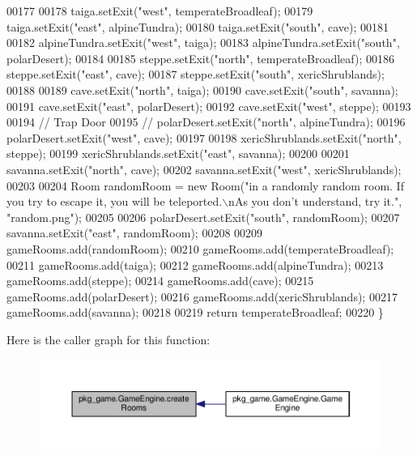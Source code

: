 \begin{DoxyCode}
00177 
00178         taiga.setExit(\textcolor{stringliteral}{"west"}, temperateBroadleaf);
00179         taiga.setExit(\textcolor{stringliteral}{"east"}, alpineTundra);
00180         taiga.setExit(\textcolor{stringliteral}{"south"}, cave);
00181 
00182         alpineTundra.setExit(\textcolor{stringliteral}{"west"}, taiga);
00183         alpineTundra.setExit(\textcolor{stringliteral}{"south"}, polarDesert);
00184 
00185         steppe.setExit(\textcolor{stringliteral}{"north"}, temperateBroadleaf);
00186         steppe.setExit(\textcolor{stringliteral}{"east"}, cave);
00187         steppe.setExit(\textcolor{stringliteral}{"south"}, xericShrublands);
00188 
00189         cave.setExit(\textcolor{stringliteral}{"north"}, taiga);
00190         cave.setExit(\textcolor{stringliteral}{"south"}, savanna);
00191         cave.setExit(\textcolor{stringliteral}{"east"}, polarDesert);
00192         cave.setExit(\textcolor{stringliteral}{"west"}, steppe);
00193 
00194         \textcolor{comment}{// Trap Door}
00195         \textcolor{comment}{// polarDesert.setExit("north", alpineTundra);}
00196         polarDesert.setExit(\textcolor{stringliteral}{"west"}, cave);
00197 
00198         xericShrublands.setExit(\textcolor{stringliteral}{"north"}, steppe);
00199         xericShrublands.setExit(\textcolor{stringliteral}{"east"}, savanna);
00200 
00201         savanna.setExit(\textcolor{stringliteral}{"north"}, cave);
00202         savanna.setExit(\textcolor{stringliteral}{"west"}, xericShrublands);
00203 
00204         Room randomRoom = \textcolor{keyword}{new} Room(\textcolor{stringliteral}{"in a randomly random room. If you try to escape it, you will be
       teleported.\(\backslash\)nAs you don't understand, try it."}, \textcolor{stringliteral}{"random.png"});
00205 
00206         polarDesert.setExit(\textcolor{stringliteral}{"south"}, randomRoom);
00207         savanna.setExit(\textcolor{stringliteral}{"east"}, randomRoom);
00208 
00209         gameRooms.add(randomRoom);
00210         gameRooms.add(temperateBroadleaf);
00211         gameRooms.add(taiga);
00212         gameRooms.add(alpineTundra);
00213         gameRooms.add(steppe);
00214         gameRooms.add(cave);
00215         gameRooms.add(polarDesert);
00216         gameRooms.add(xericShrublands);
00217         gameRooms.add(savanna);
00218 
00219         \textcolor{keywordflow}{return} temperateBroadleaf;
00220     \}
\end{DoxyCode}


Here is the caller graph for this function\-:
\nopagebreak
\begin{figure}[H]
\begin{center}
\leavevmode
\includegraphics[width=350pt]{classpkg__game_1_1GameEngine_a986180eff9d235e3b619c7403accfc31_icgraph}
\end{center}
\end{figure}


